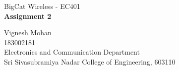 \documentclass[a4paper]{article}
\begin{document}

\Large
 \begin{center}
BigCat Wireless - EC401\\
\textbf{Assignment 2}

\hspace{10pt}

\large
Vignesh Mohan\\
\smallskip
\small
183002181\\
\small
Electronics and Communication Department\\
\small
Sri Sivasubramiya Nadar College of Engineering, 603110\\
\end{center}

\hspace{10pt}
\normalsize
\end{document}
